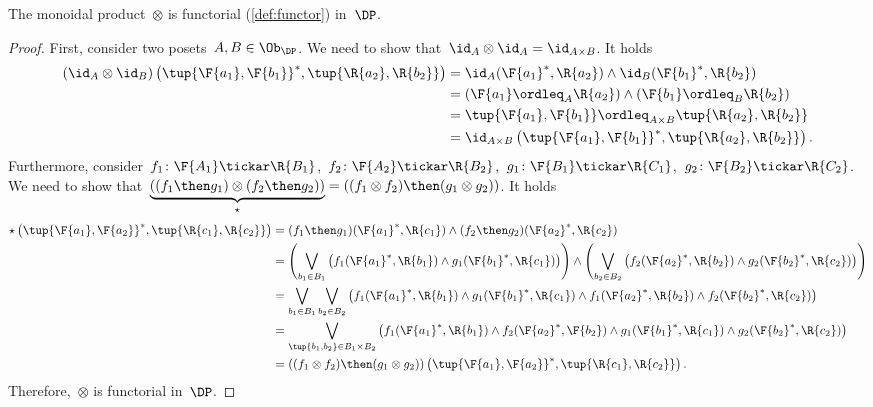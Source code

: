 \begin{lemma}
\label{lemma:monoidal_functorial}
The monoidal product~$\otimes$ is functorial (\cref{def:functor}) in~$\DP$.
\end{lemma}
\begin{proof}
First, consider two posets~$A,B\in \Ob_\DP$. We need to show that~$\id_A\otimes \id_A = \id_{A\times B}$. It holds
\begin{equation}
\begin{aligned}
    \left( \id_{A}\otimes \id_{B}\right)
    \left( \tup{\F{a_1},\F{b_1}}^*,\tup{\R{a_2},\R{b_2}}\right)&=
    \id_A(\F{a_1}^*,\R{a_2})\wedge \id_B(\F{b_1}^*,\R{b_2})\\
    &=\left( \F{a_1}\ordleq_A \R{a_2}\right)\wedge \left( \F{b_1}\ordleq_B \R{b_2}\right)\\
    &=\tup{\F{a_1},\F{b_1}}\ordleq_{A\times B}\tup{\R{a_2},\R{b_2}}\\
    &=\id_{A\times B}\left( \tup{\F{a_1},\F{b_1}}^*,\tup{\R{a_2},\R{b_2}}\right).
\end{aligned}
\end{equation}
Furthermore, consider~$f_1\colon \F{A_1} \tickar \R{B_1}$,~$f_2\colon \F{A_2}\tickar \R{B_2}$,~$g_1\colon \F{B_1}\tickar \R{C_1}$,~$g_2\colon \F{B_2}\tickar \R{C_2}$. We need to show that~$\underbrace{\left( (f_1\then g_1) \otimes (f_2\then g_2)\right)}_{\star}=\left( (f_1\otimes f_2)\then (g_1\otimes g_2)\right)$. It holds
\begin{equation}
\begin{aligned}
    \star \left( \tup{\F{a_1},\F{a_2}}^*,\tup{\R{c_1},\R{c_2}}\right)&=(f_1\then g_1)(\F{a_1}^*,\R{c_1})\wedge (f_2\then g_2)(\F{a_2}^*,\R{c_2})\\
    &=\left(\bigvee_{b_1\in B_1}\left( f_1(\F{a_1}^*,\R{b_1})\wedge g_1(\F{b_1}^*,\R{c_1})\right)\right) \wedge\left(\bigvee_{b_2\in B_2}\left( f_2(\F{a_2}^*,\R{b_2})\wedge g_2(\F{b_2}^*,\R{c_2})\right)\right)\\
    &=\bigvee_{b_1\in B_1}\bigvee_{b_2\in B_2} \left(f_1(\F{a_1}^*,\R{b_1})\wedge g_1(\F{b_1}^*,\R{c_1})\wedge f_1(\F{a_2}^*,\R{b_2})\wedge f_2(\F{b_2}^*,\R{c_2}) \right)\\
    &=\bigvee_{\tup{b_1,b_2}\in B_1\times B_2} \left(f_1(\F{a_1}^*,\R{b_1})\wedge f_2(\F{a_2}^*,\F{b_2})\wedge g_1(\F{b_1}^*,\R{c_1})\wedge g_2(\F{b_2}^*,\R{c_2}) \right)\\
    &=\left( (f_1\otimes f_2)\then (g_1\otimes g_2)\right)\left(\tup{\F{a_1},\F{a_2}}^*,\tup{\R{c_1},\R{c_2}} \right).
\end{aligned}
\end{equation}
Therefore,~$\otimes$ is functorial in~$\DP$.
\end{proof}


